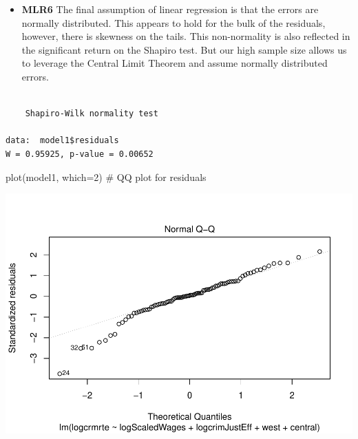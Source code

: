 \documentclass[]{article}
\newenvironment{Shaded}{}{}
\newcommand{\CommentTok}[1]{\textcolor[rgb]{0.00,0.50,0.00}{#1}}
\newcommand{\DataTypeTok}[1]{#1}
\newcommand{\DecValTok}[1]{#1}
\newcommand{\KeywordTok}[1]{\textcolor[rgb]{0.00,0.00,1.00}{#1}}
\newcommand{\NormalTok}[1]{#1}
\newcommand{\OperatorTok}[1]{#1}
\providecommand{\tightlist}{%
  \setlength{\itemsep}{0pt}\setlength{\parskip}{0pt}}
\begin{document}
\begin{itemize}
\tightlist
\item
  \textbf{MLR6} The final assumption of linear regression is that the
  errors are normally distributed. This appears to hold for the bulk of
  the residuals, however, there is skewness on the tails. This
  non-normality is also reflected in the significant return on the
  Shapiro test. But our high sample size allows us to leverage the
  Central Limit Theorem and assume normally distributed errors.
\end{itemize}

\begin{Shaded}
\end{Shaded}

\begin{verbatim}

    Shapiro-Wilk normality test

data:  model1$residuals
W = 0.95925, p-value = 0.00652
\end{verbatim}

\begin{Shaded}
\begin{Highlighting}[]
\KeywordTok{plot}\NormalTok{(model1, }\DataTypeTok{which=}\DecValTok{2}\NormalTok{) }\CommentTok{# QQ plot for residuals}
\end{Highlighting}
\end{Shaded}

\includegraphics{Bagnard_Gaustad_Hartman_Leung_Lab_3_files/figure-latex/unnamed-chunk-63-1.pdf}
\end{document}
